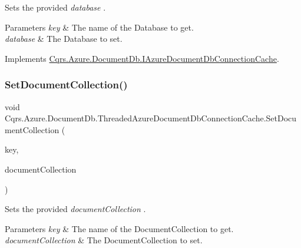 Sets the provided {\itshape database} . 


\begin{DoxyParams}{Parameters}
{\em key} & The name of the Database to get.\\
\hline
{\em database} & The Database to set.\\
\hline
\end{DoxyParams}


Implements \hyperlink{interfaceCqrs_1_1Azure_1_1DocumentDb_1_1IAzureDocumentDbConnectionCache_a9242c99ffb76f8ad9b15cab617056bf0_a9242c99ffb76f8ad9b15cab617056bf0}{Cqrs.\+Azure.\+Document\+Db.\+I\+Azure\+Document\+Db\+Connection\+Cache}.

\mbox{\label{classCqrs_1_1Azure_1_1DocumentDb_1_1ThreadedAzureDocumentDbConnectionCache_a069d9161ed5649cc3e65cda641d5173d_a069d9161ed5649cc3e65cda641d5173d}} 
\subsubsection{\texorpdfstring{Set\+Document\+Collection()}{SetDocumentCollection()}}
{\footnotesize\ttfamily void Cqrs.\+Azure.\+Document\+Db.\+Threaded\+Azure\+Document\+Db\+Connection\+Cache.\+Set\+Document\+Collection (\begin{DoxyParamCaption}\item[{string}]{key,  }\item[{Document\+Collection}]{document\+Collection }\end{DoxyParamCaption})}



Sets the provided {\itshape document\+Collection} . 


\begin{DoxyParams}{Parameters}
{\em key} & The name of the Document\+Collection to get.\\
\hline
{\em document\+Collection} & The Document\+Collection to set.\\
\hline
\end{DoxyParams}


